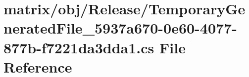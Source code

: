 \hypertarget{matrix_2obj_2_release_2_temporary_generated_file__5937a670-0e60-4077-877b-f7221da3dda1_8cs}{\section{matrix/obj/\-Release/\-Temporary\-Generated\-File\-\_\-5937a670-\/0e60-\/4077-\/877b-\/f7221da3dda1.cs File Reference}
\label{matrix_2obj_2_release_2_temporary_generated_file__5937a670-0e60-4077-877b-f7221da3dda1_8cs}
}
